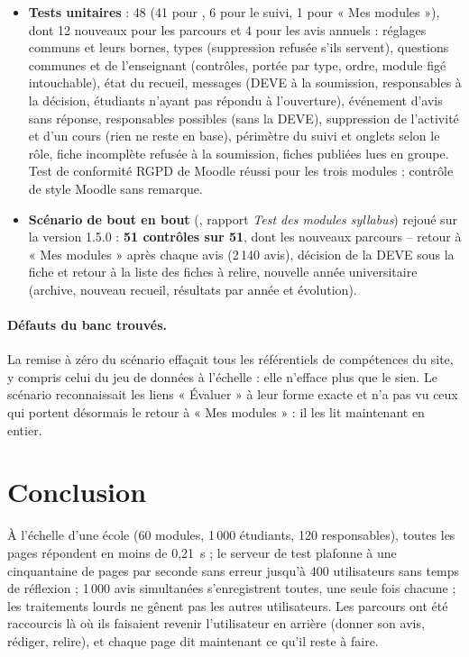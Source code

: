 \documentclass[11pt,a4paper]{article}
\newcommand{\code}[1]{\texttt{\detokenize{#1}}}
\begin{document}
\begin{itemize}
  \item \textbf{Tests unitaires} : 48 (41 pour \code{mod_syllabus}, 6 pour le suivi, 1 pour
    « Mes modules »), dont 12 nouveaux pour les parcours et 4 pour les avis annuels : réglages communs et leurs bornes, types (suppression
    refusée s'ils servent), questions communes et de l'enseignant (contrôles, portée par type,
    ordre, module figé intouchable), état du recueil, messages (DEVE à la soumission,
    responsables à la décision, étudiants n'ayant pas répondu à l'ouverture), événement
    d'avis sans réponse, responsables possibles (sans la DEVE), suppression de l'activité
    et d'un cours (rien ne reste en base), périmètre du suivi et onglets selon le rôle, fiche
    incomplète refusée à la soumission, fiches publiées lues en groupe. Test de conformité RGPD
    de Moodle réussi pour les trois modules ; contrôle de style Moodle sans remarque.
  \item \textbf{Scénario de bout en bout} (\code{syllabus_interactions.py}, rapport
    \emph{Test des modules syllabus}) rejoué sur la version 1.5.0 : \textbf{51 contrôles sur 51},
    dont les nouveaux parcours -- retour à « Mes modules » après chaque avis (2\,140
    avis), décision de la DEVE sous la fiche et retour à la liste des fiches à relire, nouvelle
    année universitaire (archive, nouveau recueil, résultats par année et évolution).
\end{itemize}

\paragraph{Défauts du banc trouvés.} La remise à zéro du scénario effaçait tous les référentiels
de compétences du site, y compris celui du jeu de données à l'échelle : elle n'efface plus que
le sien. Le scénario reconnaissait les liens « Évaluer » à leur forme exacte et n'a pas vu ceux
qui portent désormais le retour à « Mes modules » : il les lit maintenant en entier.

\section{Conclusion}

À l'échelle d'une école (60 modules, 1\,000 étudiants, 120 responsables), toutes les pages
répondent en moins de 0,21~s ; le serveur de test plafonne à une cinquantaine de pages par
seconde sans erreur jusqu'à 400 utilisateurs sans temps de réflexion ; 1\,000 avis
simultanées s'enregistrent toutes, une seule fois chacune ; les traitements lourds ne gênent pas
les autres utilisateurs. Les parcours ont été raccourcis là où ils faisaient revenir l'utilisateur
en arrière (donner son avis, rédiger, relire), et chaque page dit maintenant ce qu'il reste à faire.
\end{document}

